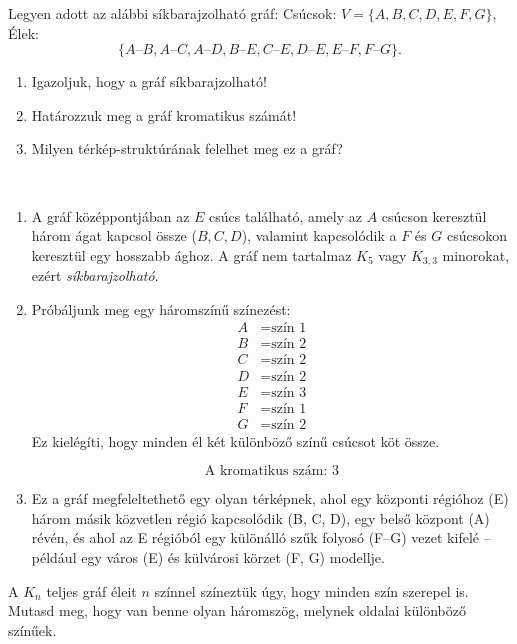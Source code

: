 \vspace{1em}

\begin{extraproblem}
	Legyen adott az alábbi síkbarajzolható gráf: Csúcsok: $V=\{A,B,C,D,E,F,G\}$,
	Élek: 
	\[
	\{A\text{–}B,A\text{–}C,A\text{–}D,B\text{–}E,C\text{–}E,D\text{–}E,E\text{–}F,F\text{–}G\}.
	\]
	\begin{enumerate}
		\item Igazoljuk, hogy a gráf síkbarajzolható! 
		\item Határozzuk meg a gráf kromatikus számát! 
		\item Milyen térkép-struktúrának felelhet meg ez a gráf? 
	\end{enumerate}
\end{extraproblem}

\begin{solution}
	~
	\begin{enumerate}
		\item A gráf középpontjában az $E$ csúcs található, amely az $A$ csúcson
		keresztül három ágat kapcsol össze ($B,C,D$), valamint kapcsolódik
		a $F$ és $G$ csúcsokon keresztül egy hosszabb ághoz. A gráf nem
		tartalmaz $K_{5}$ vagy $K_{3,3}$ minorokat, ezért \emph{síkbarajzolható}.
		\item Próbáljunk meg egy háromszínű színezést: 
		\[
		\begin{aligned}A & =\text{szín 1}\\
			B & =\text{szín 2}\\
			C & =\text{szín 2}\\
			D & =\text{szín 2}\\
			E & =\text{szín 3}\\
			F & =\text{szín 1}\\
			G & =\text{szín 2}
		\end{aligned}
		\]
		Ez kielégíti, hogy minden él két különböző színű csúcsot köt össze.
		
		\[
		\boxed{\text{A kromatikus szám: }3}
		\]
		
		\item Ez a gráf megfeleltethető egy olyan térképnek, ahol egy központi régióhoz
		(E) három másik közvetlen régió kapcsolódik (B, C, D), egy belső központ
		(A) révén, és ahol az E régióból egy különálló szűk folyosó (F--G)
		vezet kifelé -- például egy város (E) és külvárosi körzet (F, G)
		modellje.
	\end{enumerate}
\end{solution}
\begin{extraproblem}
	A $K_{n}$ teljes gráf éleit $n$ színnel színeztük úgy, hogy minden
	szín szerepel is. Mutasd meg, hogy van benne olyan háromszög, melynek
	oldalai különböző színűek. 
\end{extraproblem}

